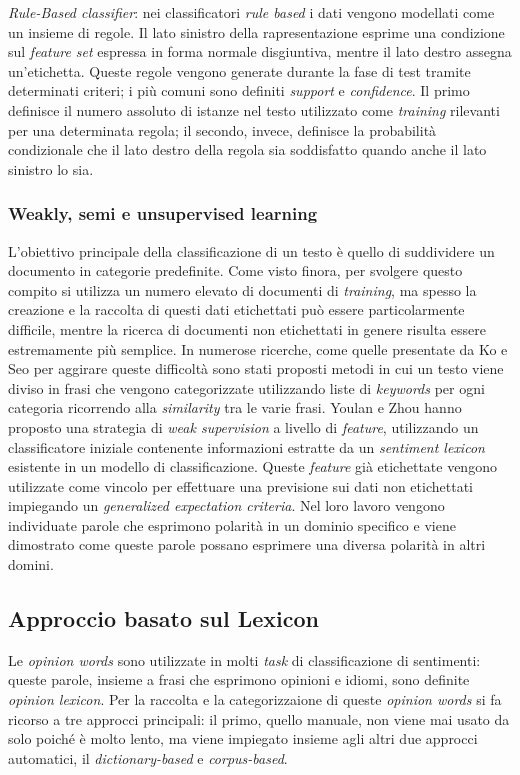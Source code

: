 \documentclass[a4paper,12pt,openright,twoside]{report}
\theoremstyle{definition}
\begin{document}
\emph{Rule-Based classifier}: nei classificatori \emph{rule based} i dati vengono modellati come un insieme di regole.
Il lato sinistro della rapresentazione esprime una condizione sul \emph{feature set} espressa in forma normale
disgiuntiva, mentre il lato destro assegna un'etichetta.
Queste regole vengono generate durante la fase di test tramite determinati criteri; i più comuni sono
definiti \emph{support} e \emph{confidence}. Il primo definisce il numero assoluto di 
istanze nel testo utilizzato
come \emph{training} rilevanti per una determinata regola; il secondo, invece, definisce la probabilità
condizionale che il lato destro della regola sia soddisfatto quando anche il lato sinistro lo sia.
\subsubsection{Weakly, semi e unsupervised learning}
L'obiettivo principale della classificazione di un testo è quello di suddividere un documento in categorie
predefinite. Come visto finora, per svolgere questo compito si utilizza un numero elevato di documenti di \emph{training},
 ma spesso la creazione e la raccolta di questi dati etichettati può essere particolarmente difficile,
 mentre
la ricerca di documenti non etichettati in genere risulta essere estremamente più semplice.
In numerose ricerche, come quelle presentate da Ko e Seo %
per aggirare queste difficoltà sono stati proposti metodi in cui un testo viene diviso in frasi che vengono categorizzate utilizzando liste
di \emph{keywords} per ogni categoria ricorrendo alla \emph{similarity} tra le varie frasi.
Youlan e Zhou %
hanno proposto una strategia di \emph{weak supervision} a  livello di \emph{feature},
utilizzando un classificatore iniziale contenente informazioni estratte da un \emph{sentiment lexicon} esistente
in un modello di classificazione. Queste \emph{feature} già etichettate vengono utilizzate come vincolo per effettuare
una previsione sui dati non etichettati impiegando un \emph{generalized expectation criteria}.
Nel loro lavoro vengono individuate parole che esprimono polarità in un dominio specifico e viene dimostrato
come queste parole possano esprimere una diversa polarità in altri domini.
\subsection{Approccio basato sul Lexicon}
Le \emph{opinion words} sono utilizzate in molti \emph{task} di classificazione di sentimenti: queste parole,
insieme a frasi che esprimono opinioni e idiomi, sono definite \emph{opinion lexicon}. 
Per la raccolta e la categorizzaione di queste \emph{opinion words} si 
fa ricorso a tre approcci principali: il primo,
quello manuale, non viene mai usato da solo poiché è molto lento, ma viene impiegato insieme agli
altri due approcci automatici, il \emph{dictionary-based} e \emph{corpus-based}.
\end{document}

